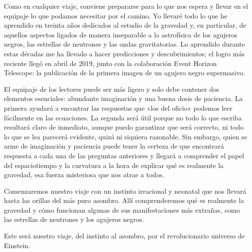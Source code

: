 Como en cualquier viaje, conviene prepararse para lo que nos espera y llevar en el equipaje lo que podamos necesitar por el camino. Yo llevaré todo lo que he aprendido en treinta años dedicados al estudio de la gravedad y, en particular, de aquellos aspectos ligados de manera inseparable a la astrofísica de los agujeros negros, las estrellas de neutrones y las ondas gravitatorias. Lo aprendido durante estas décadas me ha llevado a hacer predicciones y descubrimientos; el logro más reciente llegó en abril de 2019, junto con la colaboración Event Horizon Telescope: la publicación de la primera imagen de un agujero negro supermasivo.

El equipaje de los lectores puede ser más ligero y solo debe contener dos elementos esenciales: abundante imaginación y una buena dosis de paciencia. La primera ayudará a encontrar las respuestas que «los del oficio» podemos leer fácilmente en las ecuaciones. La segunda será útil porque no todo lo que escriba resultará claro de inmediato, aunque puedo garantizar que será correcto, ni todo lo que se lea parecerá evidente, quizá ni siquiera razonable. Sin embargo, quien se arme de imaginación y paciencia puede tener la certeza de que encontrará respuesta a cada una de las preguntas anteriores y llegará a comprender el papel del espaciotiempo y la curvatura a la hora de explicar qué es realmente la gravedad, esa fuerza misteriosa que nos atrae a todos.

Comenzaremos nuestro viaje con un instinto irracional y neonatal que nos llevará hasta las orillas del más puro asombro. Allí comprenderemos qué es realmente la gravedad y cómo funcionan algunas de sus manifestaciones más extrañas, como las estrellas de neutrones y los agujeros negros.

Este será nuestro viaje, del instinto al asombro, por el revolucionario universo de Einstein.
